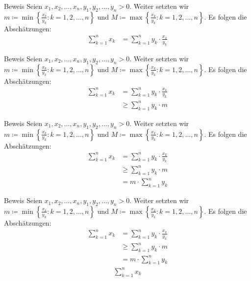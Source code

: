 \documentclass[10pt]{beamer}
\begin{document}
\begin{frame}{Beweis}
     Seien \( x_{1}, x_{2}, \ldots, x_{n}, y_{1}, y_{2}, \ldots, y_{n} > 0 \). Weiter setzten wir \( m \coloneq \min\left\{ \frac{x_{k}}{y_{k}} : k = 1, 2, \ldots, n \right\} \) und \( M \coloneq \max\left\{ \frac{x_{k}}{y_{k}} : k = 1, 2, \ldots, n \right\} \). Es folgen die Abschätzungen:
     \begin{align*}
        \sum_{k = 1}^{n} x_{k}
        & = \sum_{k = 1}^{n} y_{k} \cdot \frac{x_{k}}{y_{k}}
     \end{align*}
\end{frame}



\begin{frame}{Beweis}
     Seien \( x_{1}, x_{2}, \ldots, x_{n}, y_{1}, y_{2}, \ldots, y_{n} > 0 \). Weiter setzten wir \( m \coloneq \min\left\{ \frac{x_{k}}{y_{k}} : k = 1, 2, \ldots, n \right\} \) und \( M \coloneq \max\left\{ \frac{x_{k}}{y_{k}} : k = 1, 2, \ldots, n \right\} \). Es folgen die Abschätzungen:
     \begin{align*}
        \sum_{k = 1}^{n} x_{k}
        & = \sum_{k = 1}^{n} y_{k} \cdot \frac{x_{k}}{y_{k}} \\
        & \geq \sum_{k = 1}^{n} y_{k} \cdot m
     \end{align*}
\end{frame}



\begin{frame}{Beweis}
     Seien \( x_{1}, x_{2}, \ldots, x_{n}, y_{1}, y_{2}, \ldots, y_{n} > 0 \). Weiter setzten wir \( m \coloneq \min\left\{ \frac{x_{k}}{y_{k}} : k = 1, 2, \ldots, n \right\} \) und \( M \coloneq \max\left\{ \frac{x_{k}}{y_{k}} : k = 1, 2, \ldots, n \right\} \). Es folgen die Abschätzungen:
     \begin{align*}
        \sum_{k = 1}^{n} x_{k}
        & = \sum_{k = 1}^{n} y_{k} \cdot \frac{x_{k}}{y_{k}} \\
        & \geq \sum_{k = 1}^{n} y_{k} \cdot m \\
        & = m \cdot \sum_{k = 1}^{n} y_{k}
     \end{align*}
\end{frame}



\begin{frame}{Beweis}
     Seien \( x_{1}, x_{2}, \ldots, x_{n}, y_{1}, y_{2}, \ldots, y_{n} > 0 \). Weiter setzten wir \( m \coloneq \min\left\{ \frac{x_{k}}{y_{k}} : k = 1, 2, \ldots, n \right\} \) und \( M \coloneq \max\left\{ \frac{x_{k}}{y_{k}} : k = 1, 2, \ldots, n \right\} \). Es folgen die Abschätzungen:
     \begin{align*}
        \sum_{k = 1}^{n} x_{k}
        & = \sum_{k = 1}^{n} y_{k} \cdot \frac{x_{k}}{y_{k}} \\
        & \geq \sum_{k = 1}^{n} y_{k} \cdot m \\
        & = m \cdot \sum_{k = 1}^{n} y_{k}
     \end{align*}
     \begin{align*}
        \sum_{k = 1}^{n} x_{k}
     \end{align*}
\end{frame}
\end{document}
